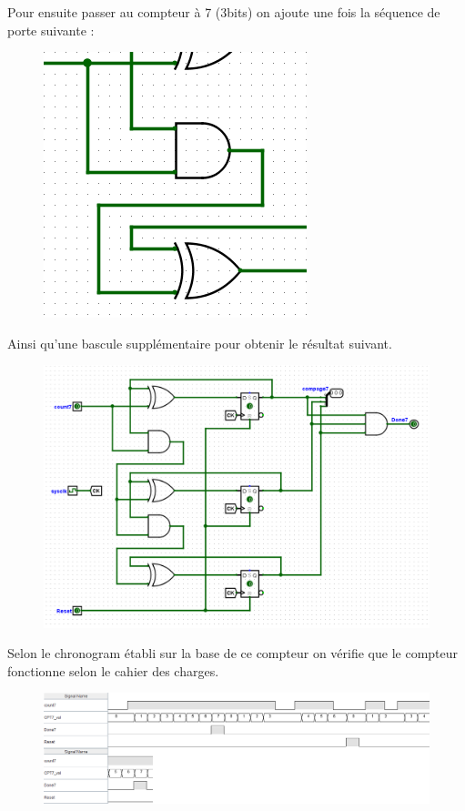 \documentclass[a4paper]{article} %
\begin{document}
\begin{tcolorbox}[colframe=Monokaimagenta,colback=white, breakable, enhanced]
Pour ensuite passer au compteur à 7 (3bits) on ajoute une fois la séquence de porte suivante :
\begin{figure}[H]
	\centering
	\includegraphics[scale=0.5]{src/sequence_CPT3}
	\label{fig:sequence_CPT3}
\end{figure}

Ainsi qu'une bascule supplémentaire pour obtenir le résultat suivant.

\begin{figure}[H]
	\centering
	\includegraphics[width=\textwidth]{src/CPT_07}
	\label{fig:CPT_07}
\end{figure}

Selon le chronogram établi sur la base de ce compteur on vérifie que le compteur fonctionne selon le cahier des charges.
\begin{figure}[H]
	\centering
	\includegraphics[width=\textwidth]{src/chrono_CPT7}
	\label{fig:chronogramCPT7}
\end{figure}


\end{tcolorbox}
\end{document}
